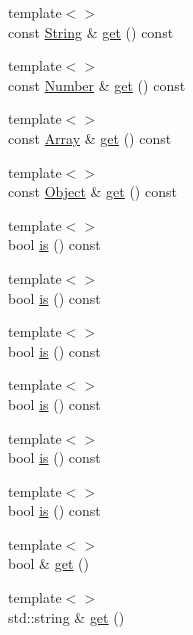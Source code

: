 \begin{DoxyCompactItemize}
\item 
{\footnotesize template$<$$>$ }\\const \hyperlink{namespacejsonxx_a29c7a7494bb75c227bdbd208dc80a09f}{String} \& \hyperlink{classjsonxx_1_1_value_a8ebb1d92392e40c5d0e9bac778f9ca92}{get} () const 
\item 
{\footnotesize template$<$$>$ }\\const \hyperlink{namespacejsonxx_a189d79e326066a8e082664e4062f3fc8}{Number} \& \hyperlink{classjsonxx_1_1_value_aea4dc5c0be793e798257bbf562378912}{get} () const 
\item 
{\footnotesize template$<$$>$ }\\const \hyperlink{classjsonxx_1_1_array}{Array} \& \hyperlink{classjsonxx_1_1_value_ada7baca4dbe0be4cabe652f0ae099508}{get} () const 
\item 
{\footnotesize template$<$$>$ }\\const \hyperlink{classjsonxx_1_1_object}{Object} \& \hyperlink{classjsonxx_1_1_value_a1f9ef7dd8a5337636ec71699eecf2d3c}{get} () const 
\item 
{\footnotesize template$<$$>$ }\\bool \hyperlink{classjsonxx_1_1_value_a164b1a3988e31796320858f58d9ebd5d}{is} () const 
\item 
{\footnotesize template$<$$>$ }\\bool \hyperlink{classjsonxx_1_1_value_a164b1a3988e31796320858f58d9ebd5d}{is} () const 
\item 
{\footnotesize template$<$$>$ }\\bool \hyperlink{classjsonxx_1_1_value_a164b1a3988e31796320858f58d9ebd5d}{is} () const 
\item 
{\footnotesize template$<$$>$ }\\bool \hyperlink{classjsonxx_1_1_value_a164b1a3988e31796320858f58d9ebd5d}{is} () const 
\item 
{\footnotesize template$<$$>$ }\\bool \hyperlink{classjsonxx_1_1_value_a164b1a3988e31796320858f58d9ebd5d}{is} () const 
\item 
{\footnotesize template$<$$>$ }\\bool \hyperlink{classjsonxx_1_1_value_a164b1a3988e31796320858f58d9ebd5d}{is} () const 
\item 
{\footnotesize template$<$$>$ }\\bool \& \hyperlink{classjsonxx_1_1_value_aaf0fb70e2062bdff3eeb3205b74512e3}{get} ()
\item 
{\footnotesize template$<$$>$ }\\std\+::string \& \hyperlink{classjsonxx_1_1_value_a765462c916ed83cc8aa5c983fce9679d}{get} ()

\end{DoxyCompactItemize}
